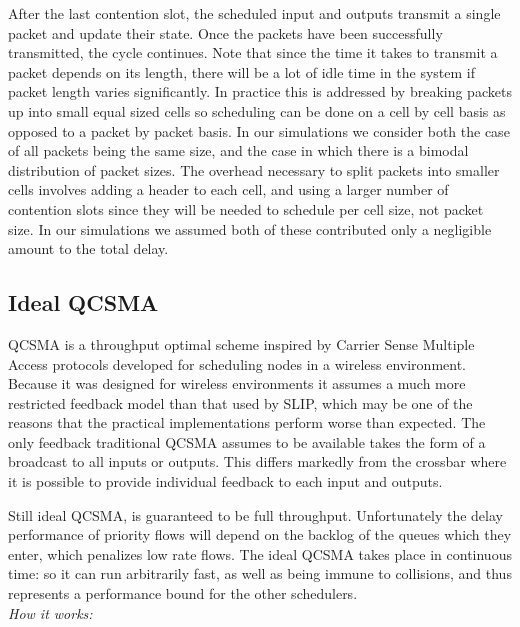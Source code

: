 \documentclass[11pt]{article}%
\begin{document}
After the last contention slot, the scheduled input and outputs transmit a single packet and update their state.  Once the packets have been successfully transmitted, the cycle continues.  Note that since the time it takes to transmit a packet depends on its length, there will be a lot of idle time in the system if packet length varies significantly.  In practice this is addressed by breaking packets up into small equal sized cells so scheduling can be done on a cell by cell basis as opposed to a packet by packet basis.  In our simulations we consider both the case of all packets being the same size, and the case in which there is a bimodal distribution of packet sizes.  The overhead necessary to split packets into smaller cells involves adding a header to each cell, and using a larger number of contention slots since they will be needed to schedule per cell size, not packet size.  In our simulations we assumed both of these contributed only a negligible amount to the total delay.

\subsection{Ideal QCSMA}


QCSMA is a throughput optimal scheme inspired by Carrier Sense Multiple Access protocols developed for scheduling nodes in a wireless environment.  Because it was designed for wireless environments it assumes a much more restricted feedback model than that used by SLIP, which may be one of the reasons that the practical implementations perform worse than expected.  The only feedback traditional QCSMA assumes to be available takes the form of a broadcast to all inputs or outputs. This differs markedly from the crossbar where it is possible to provide individual feedback to each input and outputs.%

Still ideal QCSMA, is guaranteed to be full throughput.  Unfortunately the delay performance of priority flows will depend on the backlog of the queues which they enter, which penalizes low rate flows.  The ideal QCSMA takes place in continuous time: so it can run arbitrarily fast, as well as being immune to collisions, and thus represents a performance bound for the other schedulers.\\

{\it How it works:}
\end{document}
